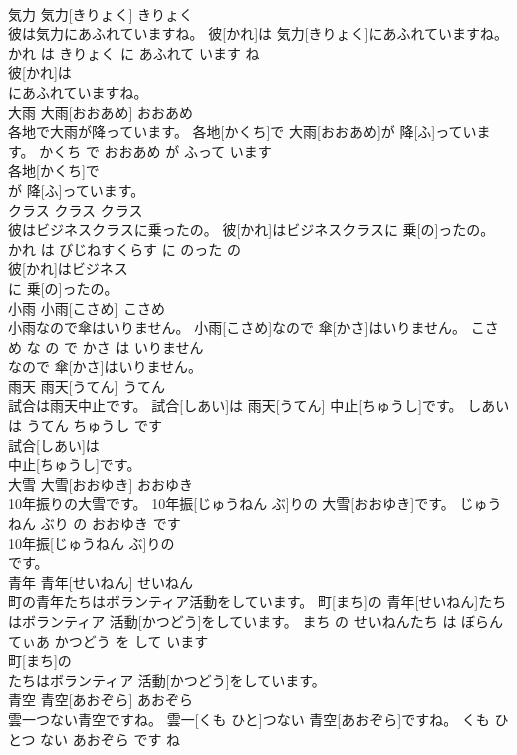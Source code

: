 \documentclass[8pt]{extreport}
\begin{document}
\begin{CJK}{UTF8}{min}
\\	気力	気力[きりょく]	きりょく	
\\	彼は気力にあふれていますね。	彼[かれ]は 気力[きりょく]にあふれていますね。	かれ は きりょく に あふれて います ね	
\\	彼[かれ]は
\\	にあふれていますね。			
\\	大雨	大雨[おおあめ]	おおあめ	
\\	各地で大雨が降っています。	各地[かくち]で 大雨[おおあめ]が 降[ふ]っています。	かくち で おおあめ が ふって います	
\\	各地[かくち]で
\\	が 降[ふ]っています。			
\\	クラス	クラス	クラス	
\\	彼はビジネスクラスに乗ったの。	彼[かれ]はビジネスクラスに 乗[の]ったの。	かれ は びじねすくらす に のった の	
\\	彼[かれ]はビジネス
\\	に 乗[の]ったの。			
\\	小雨	小雨[こさめ]	こさめ	
\\	小雨なので傘はいりません。	小雨[こさめ]なので 傘[かさ]はいりません。	こさめ な の で かさ は いりません	
\\	なので 傘[かさ]はいりません。			
\\	雨天	雨天[うてん]	うてん	
\\	試合は雨天中止です。	試合[しあい]は 雨天[うてん] 中止[ちゅうし]です。	しあい は うてん ちゅうし です	
\\	試合[しあい]は
\\	中止[ちゅうし]です。			
\\	大雪	大雪[おおゆき]	おおゆき	
\\	10年振りの大雪です。	10年振[じゅうねん ぶ]りの 大雪[おおゆき]です。	じゅうねん ぶり の おおゆき です	
\\	10年振[じゅうねん ぶ]りの
\\	です。			
\\	青年	青年[せいねん]	せいねん	
\\	町の青年たちはボランティア活動をしています。	町[まち]の 青年[せいねん]たちはボランティア 活動[かつどう]をしています。	まち の せいねんたち は ぼらんてぃあ かつどう を して います	
\\	町[まち]の
\\	たちはボランティア 活動[かつどう]をしています。			
\\	青空	青空[あおぞら]	あおぞら	
\\	雲一つない青空ですね。	雲一[くも ひと]つない 青空[あおぞら]ですね。	くも ひとつ ない あおぞら です ね	

\end{CJK}
\end{document}
